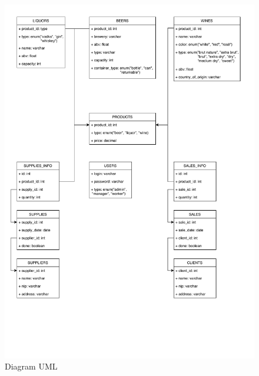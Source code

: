 \documentclass[12pt,a4paper]{article}
\begin{document}
\begin{figure}
    \centering
    \includegraphics[width=\columnwidth]{uml}
    \caption{Diagram UML}
    \label{fig:diagram}
\end{figure}
    
    
\end{document}
